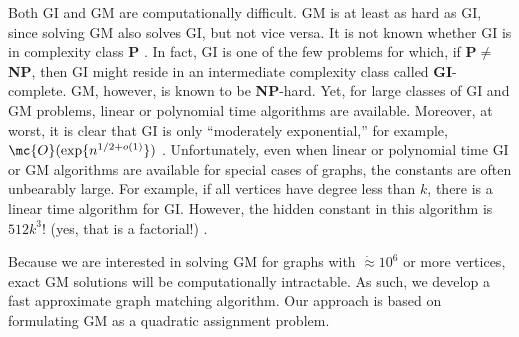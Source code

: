 \documentclass{article} %
\begin{document}
Both GI and GM are computationally difficult. GM is at least as hard as GI, since solving GM also solves GI, but not vice versa. It is not known whether GI is in complexity class \textbf{P} \cite{Fortin1996}.  In fact, GI is one of the few problems for which, if \textbf{P}$\neq$\textbf{NP}, then GI might reside in an intermediate complexity class called \textbf{GI}-complete.  GM, however, is known to be \textbf{NP}-hard.    
Yet, for large classes of GI and GM problems, linear or polynomial time algorithms are available.%
 Moreover, at worst, it is clear that GI is only ``moderately exponential,'' for example, $\mc{O}(\exp\{n^{1/2 + o(1)}\})$ \cite{Babai1981}.  Unfortunately, even when linear or polynomial time GI or GM algorithms are available for special cases of graphs, the constants are often unbearably large.  For example, if all vertices have degree less than $k$, there is a linear time algorithm for GI.  However, the hidden constant in this algorithm is $512k^3!$ (yes, that is a factorial!) \cite{Chen1994}.  

Because we are interested in solving GM for graphs with $\dot{\approx} 10^6$ or more vertices, exact GM solutions will be computationally intractable. As such, we develop a fast approximate graph matching algorithm.   Our approach is based on formulating GM as a quadratic assignment problem.  %




\end{document}
